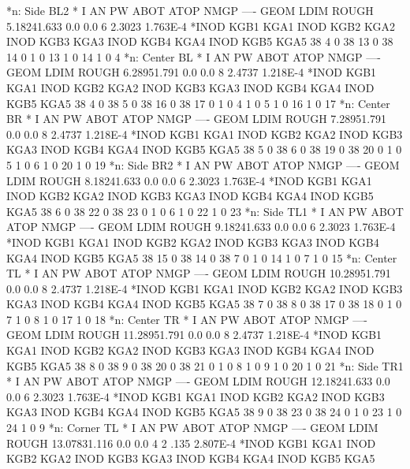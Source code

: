 *n: Side BL2
*   I   AN   PW ABOT ATOP NMGP ---- GEOM LDIM     ROUGH
    5.18241.633  0.0  0.0    6         2.3023  1.763E-4
*INOD KGB1 KGA1 INOD KGB2 KGA2 INOD KGB3 KGA3 INOD KGB4 KGA4 INOD KGB5 KGA5
   38    4    0   38   13    0   38   14    0    1    0   13    1    0   14
    1    0    4
*n: Center BL
*   I   AN   PW ABOT ATOP NMGP ---- GEOM LDIM     ROUGH
    6.28951.791  0.0  0.0    8         2.4737  1.218E-4
*INOD KGB1 KGA1 INOD KGB2 KGA2 INOD KGB3 KGA3 INOD KGB4 KGA4 INOD KGB5 KGA5
   38    4    0   38    5    0   38   16    0   38   17    0    1    0    4
    1    0    5    1    0   16    1    0   17
*n: Center BR
*   I   AN   PW ABOT ATOP NMGP ---- GEOM LDIM     ROUGH
    7.28951.791  0.0  0.0    8         2.4737  1.218E-4
*INOD KGB1 KGA1 INOD KGB2 KGA2 INOD KGB3 KGA3 INOD KGB4 KGA4 INOD KGB5 KGA5
   38    5    0   38    6    0   38   19    0   38   20    0    1    0    5
    1    0    6    1    0   20    1    0   19
*n: Side BR2
*   I   AN   PW ABOT ATOP NMGP ---- GEOM LDIM     ROUGH
    8.18241.633  0.0  0.0    6         2.3023  1.763E-4
*INOD KGB1 KGA1 INOD KGB2 KGA2 INOD KGB3 KGA3 INOD KGB4 KGA4 INOD KGB5 KGA5
   38    6    0   38   22    0   38   23    0    1    0    6    1    0   22
    1    0   23
*n: Side TL1
*   I   AN   PW ABOT ATOP NMGP ---- GEOM LDIM     ROUGH
    9.18241.633  0.0  0.0    6         2.3023  1.763E-4
*INOD KGB1 KGA1 INOD KGB2 KGA2 INOD KGB3 KGA3 INOD KGB4 KGA4 INOD KGB5 KGA5
   38   15    0   38   14    0   38    7    0    1    0   14    1    0    7
    1    0   15
*n: Center TL
*   I   AN   PW ABOT ATOP NMGP ---- GEOM LDIM     ROUGH
   10.28951.791  0.0  0.0    8         2.4737  1.218E-4
*INOD KGB1 KGA1 INOD KGB2 KGA2 INOD KGB3 KGA3 INOD KGB4 KGA4 INOD KGB5 KGA5
   38    7    0   38    8    0   38   17    0   38   18    0    1    0    7
    1    0    8    1    0   17    1    0   18
*n: Center TR
*   I   AN   PW ABOT ATOP NMGP ---- GEOM LDIM     ROUGH
   11.28951.791  0.0  0.0    8         2.4737  1.218E-4
*INOD KGB1 KGA1 INOD KGB2 KGA2 INOD KGB3 KGA3 INOD KGB4 KGA4 INOD KGB5 KGA5
   38    8    0   38    9    0   38   20    0   38   21    0    1    0    8
    1    0    9    1    0   20    1    0   21
*n: Side TR1
*   I   AN   PW ABOT ATOP NMGP ---- GEOM LDIM     ROUGH
   12.18241.633  0.0  0.0    6         2.3023  1.763E-4
*INOD KGB1 KGA1 INOD KGB2 KGA2 INOD KGB3 KGA3 INOD KGB4 KGA4 INOD KGB5 KGA5
   38    9    0   38   23    0   38   24    0    1    0   23    1    0   24
    1    0    9
*n: Corner TL
*   I   AN   PW ABOT ATOP NMGP ---- GEOM LDIM     ROUGH
   13.07831.116  0.0  0.0    4         2 .135  2.807E-4
*INOD KGB1 KGA1 INOD KGB2 KGA2 INOD KGB3 KGA3 INOD KGB4 KGA4 INOD KGB5 KGA5
